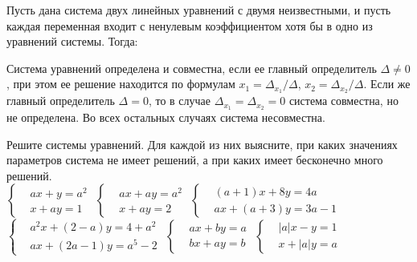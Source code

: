 \begin{problems}

\item
Пусть дана система двух линейных уравнений с двумя неизвестными, и пусть каждая
переменная входит с ненулевым коэффициентом хотя бы в одно из уравнений системы.
Тогда:\par\smallskip
Система уравнений определена и совместна,
если ее главный определитель $\Delta \not= 0$, при этом ее решение находится
по формулам
$x_1 = \Delta_{x_1} / \Delta$,
$x_2 = \Delta_{x_2} / \Delta$.
Если же главный определитель $\Delta = 0$, то в случае
$\Delta_{x_1} = \Delta_{x_2} = 0$ система совместна, но не определена.
Во всех остальных случаях система несовместна.

\item
Решите системы уравнений.
Для каждой из них выясните, при каких значениях параметров система не имеет
решений, а при каких имеет бесконечно много решений.\\[1ex]
\sbp
\(\left\{\begin{aligned}
&   a x + y = a^2
\\
&   x + a y = 1
\end{aligned}\right.\)
\qquad
\sbp
\(\left\{\begin{aligned}
&   a x + a y = a^2
\\
&   x + a y = 2
\end{aligned}\right.\)
\qquad
\sbp
\(\left\{\begin{aligned}
&   (a + 1) x + 8 y = 4 a
\\
&   a x + (a + 3) y = 3 a - 1
\end{aligned}\right.\)
\\[1ex]
\sbp
\(\left\{\begin{aligned}
&   a^2 x + (2 - a) y = 4 + a^2
\\
&   a x + (2 a - 1) y = a^5 - 2
\end{aligned}\right.\)
\qquad
\sbp
\(\left\{\begin{aligned}
&   a x + b y = a
\\
&   b x + a y = b
\end{aligned}\right.\)
\qquad
\sbp
\(\left\{\begin{aligned}
&   |a| x - y = 1
\\
&   x + |a| y = a
\end{aligned}\right.\)
\vspace{1ex}

\end{problems}

